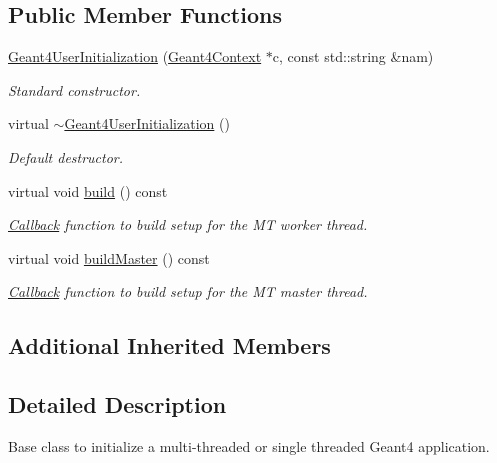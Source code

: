 \subsection*{Public Member Functions}
\begin{DoxyCompactItemize}
\item 
\hyperlink{class_d_d4hep_1_1_simulation_1_1_geant4_user_initialization_a0a36bf990b5b48d2436bed0dde12140d}{Geant4\+User\+Initialization} (\hyperlink{class_d_d4hep_1_1_simulation_1_1_geant4_context}{Geant4\+Context} $\ast$c, const std\+::string \&nam)
\begin{DoxyCompactList}\small\item\em Standard constructor. \end{DoxyCompactList}\item 
virtual \hyperlink{class_d_d4hep_1_1_simulation_1_1_geant4_user_initialization_af2367d3c7707179e2809f9a94b42bf00}{$\sim$\+Geant4\+User\+Initialization} ()
\begin{DoxyCompactList}\small\item\em Default destructor. \end{DoxyCompactList}\item 
virtual void \hyperlink{class_d_d4hep_1_1_simulation_1_1_geant4_user_initialization_a468385a353537baf52b1dbbcf6453010}{build} () const
\begin{DoxyCompactList}\small\item\em \hyperlink{class_d_d4hep_1_1_callback}{Callback} function to build setup for the MT worker thread. \end{DoxyCompactList}\item 
virtual void \hyperlink{class_d_d4hep_1_1_simulation_1_1_geant4_user_initialization_acb13e9e0c314465bcf7680fc9d205b6b}{build\+Master} () const
\begin{DoxyCompactList}\small\item\em \hyperlink{class_d_d4hep_1_1_callback}{Callback} function to build setup for the MT master thread. \end{DoxyCompactList}\end{DoxyCompactItemize}
\subsection*{Additional Inherited Members}


\subsection{Detailed Description}
Base class to initialize a multi-\/threaded or single threaded Geant4 application. 

